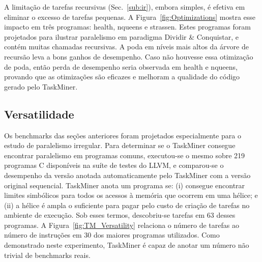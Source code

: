 \documentclass[sigplan,10pt]{acmart}
\newcommand\Taskminer{\mbox{\textsf{TaskMiner}}}
\begin{document}
A limitação de tarefas recursivas (Sec.~\ref{sub:ir}), embora simples,
é efetiva em eliminar o excesso de tarefas pequenas. 
A Figura~\ref{fig:Optimizations} mostra esse impacto em três programas: \textsf{health}, \textsf{nqueens} e
\textsf{strassen}. Estes programas foram projetados para ilustrar paralelismo
em paradigma Dividir \& Conquistar, e contém muitas chamadas
recursivas. A poda em níveis mais altos da árvore de recursão leva a bons ganhos de desempenho. 
Caso não houvesse essa otimização de poda, então perda de desempenho seria observada
em  \textsf{health} e \textsf{nqueens}, provando que as otimizações são eficazes e melhoram
a qualidade do código gerado pelo \Taskminer{}.

\subsection{Versatilidade}
\label{sub:versatility}

Os benchmarks das seções anteriores foram projetados especialmente para o estudo de 
paralelismo irregular. Para determinar se o \Taskminer{} consegue encontrar paralelismo 
em programas comuns, executou-se o mesmo sobre 219 programas C disponíveis
na suíte de testes do LLVM, e comparou-se o desempenho da versão anotada automaticamente pelo
\Taskminer{} com a versão original sequencial. 
\Taskminer{} anota um programa se:
(i) consegue encontrar limites simbólicos para todos os acessos à memória que ocorrem em uma hélice; e
(ii) a hélice é ampla o suficiente para pagar pelo custo de criação de tarefas no ambiente de execução.
Sob esses termos, descobriu-se tarefas em 63 desses programas. A Figura~\ref{fig:TM_Versatility} relaciona
o número de tarefas ao número de instruções em 30 dos maiores programas utilizados.
Como demonstrado neste experimento,
\Taskminer{} é capaz de anotar um número não trivial de benchmarks reais.
\end{document}
